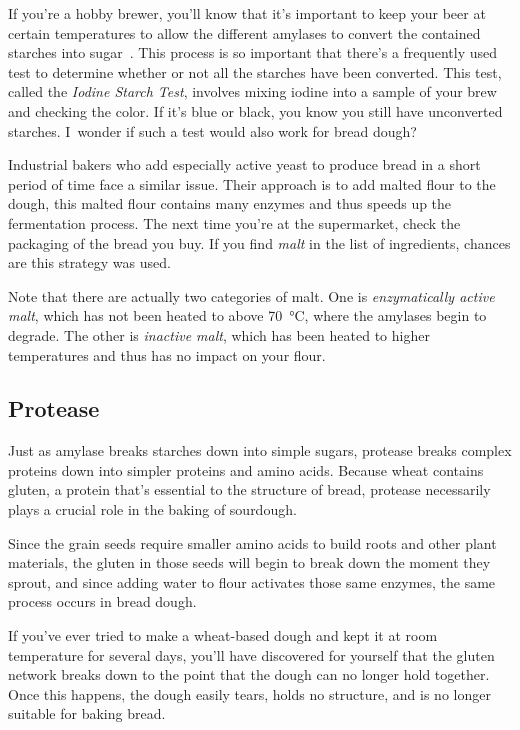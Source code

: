 If you're a hobby brewer, you'll know that it's important to keep your beer at
certain temperatures to allow the different amylases to convert the contained
starches into sugar~\cite{beer+amylase}. This process is so important that
there's a frequently used test to determine whether or not all the starches
have been converted.
This test, called the \emph{Iodine Starch Test}, involves mixing iodine into
a sample of your brew and checking the color. If it's blue or black, you know
you still have unconverted starches. I~wonder if such a test would also work
for bread dough?

Industrial bakers who add especially active yeast to produce bread in a short
period of time face a similar issue. Their approach is to add malted flour to
the dough, this malted flour contains many enzymes and thus speeds up the
fermentation process. The next time you're at the supermarket, check the
packaging of the bread you buy. If you find \emph{malt} in the list of
ingredients, chances are this strategy was used.

Note that there are actually two categories of malt. One is \emph{enzymatically
active malt}, which has not been heated to above  \qty{70}{\degreeCelsius}, where the amylases begin
to degrade. The other is \emph{inactive malt}, which has been heated to higher
temperatures and thus has no impact on your flour.

\subsection{Protease}

Just as amylase breaks starches down into simple sugars, protease breaks
complex proteins down into simpler proteins and amino acids. Because wheat
contains gluten, a protein that's essential to the structure of bread,
protease necessarily plays a crucial role in the baking of sourdough.

Since the grain seeds require smaller amino acids to build roots and other
plant materials, the gluten in those seeds will begin to break down the moment
they sprout, and since adding water to flour activates those same enzymes,
the same process occurs in bread dough.

If you've ever tried to make a wheat-based dough and kept it at room
temperature for several days, you'll have discovered for yourself that the
gluten network breaks down to the point that the dough can no longer hold together. Once
this happens, the dough easily tears, holds no structure, and is no
longer suitable for baking bread.

